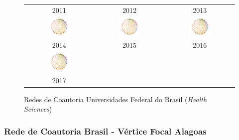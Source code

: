 \begin{figure}[H]
\begin{tabular}{ccc}
		2011 & 2012 & 2013\\[6pt]
		\includegraphics[width=0.35\textwidth]{Imagens/rede-2014.pdf} &
		\includegraphics[width=0.35\textwidth]{Imagens/rede-2015.pdf} &
		\includegraphics[width=0.35\textwidth]{Imagens/rede-2016.pdf} \\
		2014 & 2015 & 2016\\[6pt]  \includegraphics[width=0.35\textwidth]{Imagens/rede-2017.pdf} & & \\
		2017 & & \\
	\end{tabular}
	\caption{Redes de Coautoria Universidades Federal do Brasil (\textit{Health Sciences})}
	\label{rede-br-health}
\end{figure}

\subsubsection{Rede de Coautoria Brasil - Vértice Focal Alagoas}


